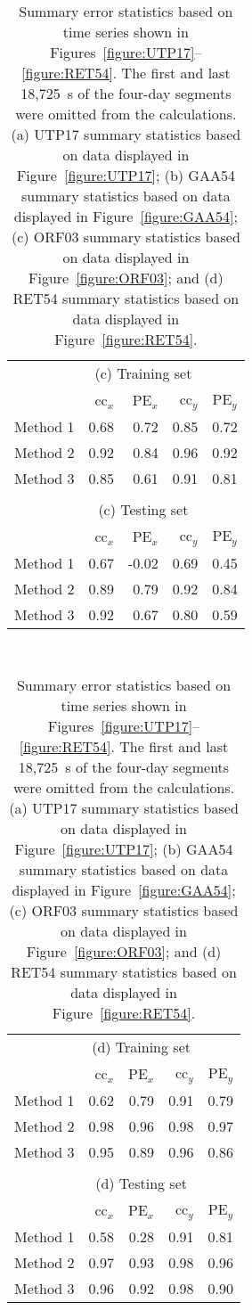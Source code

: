 \documentclass[linenumbers,draft]{agujournal}
\begin{document}
\begin{table}
  \begin{tabular}{ l r r r r }
& \multicolumn{3}{c}{(c) Training set}\\
& cc$_x$ & PE$_x$ & cc$_y$ & PE$_y$\\
\hline
Method 1 & 0.68 & 0.72 & 0.85 & 0.72\\
Method 2 & 0.92 & 0.84 & 0.96 & 0.92\\
Method 3 & 0.85 & 0.61 & 0.91 & 0.81\\
\\
& \multicolumn{3}{c}{(c) Testing set}\\
& cc$_x$ & PE$_x$ & cc$_y$ & PE$_y$\\
\hline
Method 1 & 0.67 & -0.02 & 0.69 & 0.45\\
Method 2 & 0.89 & 0.79 & 0.92 & 0.84\\
Method 3 & 0.92 & 0.67 & 0.80 & 0.59\\
%    
  \end{tabular}
\\
  \begin{tabular}{ l r r r r }
& \multicolumn{3}{c}{(d) Training set}\\
& cc$_x$ & PE$_x$ & cc$_y$ & PE$_y$\\
\hline
Method 1 & 0.62 & 0.79 & 0.91 & 0.79\\
Method 2 & 0.98 & 0.96 & 0.98 & 0.97\\
Method 3 & 0.95 & 0.89 & 0.96 & 0.86\\
\\
& \multicolumn{3}{c}{(d) Testing set}\\
& cc$_x$ & PE$_x$ & cc$_y$ & PE$_y$\\
\hline
Method 1 & 0.58 & 0.28 & 0.91 & 0.81\\
Method 2 & 0.97 & 0.93 & 0.98 & 0.96\\
Method 3 & 0.96 & 0.92 & 0.98 & 0.90\\
%   
  \end{tabular}
\\
\vspace{1em}
  \caption{Summary error statistics based on time series shown in Figures~\ref{figure:UTP17}--\ref{figure:RET54}.  The first and last 18,725~s of the four-day segments were omitted from the calculations. (a) UTP17 summary statistics based on data displayed in Figure~\ref{figure:UTP17}; (b) GAA54 summary statistics based on data displayed in Figure~\ref{figure:GAA54}; (c) ORF03 summary statistics based on data displayed in Figure~\ref{figure:ORF03}; and (d) RET54 summary statistics based on data displayed in Figure~\ref{figure:RET54}.}
\label{table:SummaryStatistics}
\end{table}
\end{document}

